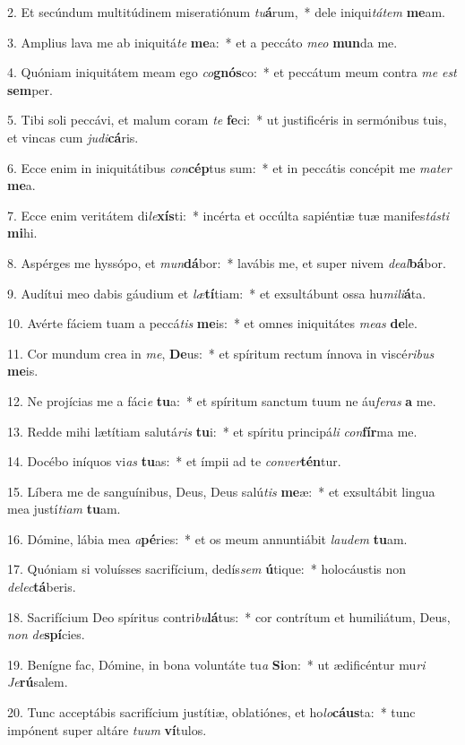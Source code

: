 2. Et secúndum multitúdinem miseratiónum \textit{tu}\textbf{á}rum,~*  dele iniqui\textit{tá}\textit{tem} \textbf{me}am.\

3. Amplius lava me ab iniquitá\textit{te} \textbf{me}a:~*  et a peccáto \textit{me}\textit{o} \textbf{mun}da me.\

4. Quóniam iniquitátem meam ego \textit{co}\textbf{gnós}co:~*  et peccátum meum contra \textit{me} \textit{est} \textbf{sem}per.\

5. Tibi soli peccávi, et malum coram \textit{te} \textbf{fe}ci:~*  ut justificéris in sermónibus tuis, et vincas cum \textit{ju}\textit{di}\textbf{cá}ris.\

6. Ecce enim in iniquitátibus \textit{con}\textbf{cép}tus sum:~*  et in peccátis concépit me \textit{ma}\textit{ter} \textbf{me}a.\

7. Ecce enim veritátem di\textit{le}\textbf{xís}ti:~*  incérta et occúlta sapiéntiæ tuæ manifes\textit{tás}\textit{ti} \textbf{mi}hi.\

8. Aspérges me hyssópo, et \textit{mun}\textbf{dá}bor:~*  lavábis me, et super nivem \textit{de}\textit{al}\textbf{bá}bor.\

9. Audítui meo dabis gáudium et \textit{læ}\textbf{tí}tiam:~*  et exsultábunt ossa hu\textit{mi}\textit{li}\textbf{á}ta.\

10. Avérte fáciem tuam a peccá\textit{tis} \textbf{me}is:~*  et omnes iniquitátes \textit{me}\textit{as} \textbf{de}le.\

11. Cor mundum crea in \textit{me}, \textbf{De}us:~*  et spíritum rectum ínnova in viscé\textit{ri}\textit{bus} \textbf{me}is.\

12. Ne projícias me a fáci\textit{e} \textbf{tu}a:~*  et spíritum sanctum tuum ne áu\textit{fe}\textit{ras} \textbf{a} me.\

13. Redde mihi lætítiam salutá\textit{ris} \textbf{tu}i:~*  et spíritu principá\textit{li} \textit{con}\textbf{fír}ma me.\

14. Docébo iníquos vi\textit{as} \textbf{tu}as:~*  et ímpii ad te \textit{con}\textit{ver}\textbf{tén}tur.\

15. Líbera me de sanguínibus, Deus, Deus salú\textit{tis} \textbf{me}æ:~*  et exsultábit lingua mea justí\textit{ti}\textit{am} \textbf{tu}am.\

16. Dómine, lábia mea \textit{a}\textbf{pé}ries:~*  et os meum annuntiábit \textit{lau}\textit{dem} \textbf{tu}am.\

17. Quóniam si voluísses sacrifícium, dedís\textit{sem} \textbf{ú}tique:~*  holocáustis non \textit{de}\textit{lec}\textbf{tá}beris.\

18. Sacrifícium Deo spíritus contri\textit{bu}\textbf{lá}tus:~*  cor contrítum et humiliátum, Deus, \textit{non} \textit{de}\textbf{spí}cies.\

19. Benígne fac, Dómine, in bona voluntáte tu\textit{a} \textbf{Si}on:~*  ut ædificéntur mu\textit{ri} \textit{Je}\textbf{rú}salem.\

20. Tunc acceptábis sacrifícium justítiæ, oblatiónes, et ho\textit{lo}\textbf{cáus}ta:~*  tunc impónent super altáre \textit{tu}\textit{um} \textbf{ví}tulos.\

